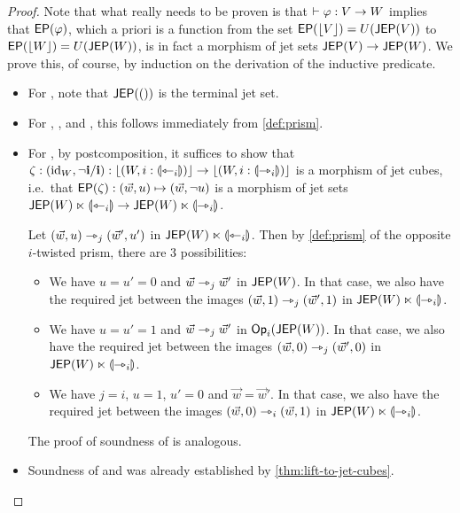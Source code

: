 \documentclass[a4paper]{memoir}
\begin{document}
\begin{proof}
	Note that what really needs to be proven is that $\vdash \varphi : V \to W$ implies that $\mathsf{EP}(\varphi)$, which a priori is a function from the set $\mathsf{EP}(\mathopen{}\left\lfloor V \right\rfloor\mathclose{}) = U(\mathsf{JEP}(V))$ to $\mathsf{EP}(\mathopen{}\left\lfloor W \right\rfloor\mathclose{}) = U(\mathsf{JEP}(W))$, is in fact a morphism of jet sets $\mathsf{JEP}(V) \to \mathsf{JEP}(W)$.
	We prove this, of course, by induction on the derivation of the inductive predicate.
	
	\begin{itemize}
		\item For , note that $\mathsf{JEP}(())$ is the terminal jet set.
	
		\item For , ,  and , this follows immediately from \cref{def:prism}.
		
		\item For , by postcomposition, it suffices to show that $\zeta : (\mathrm{id}_W, \lnot \mathbf{i} / \mathbf{i}) : \mathopen{}\left\lfloor (W, i : {\llparenthesis \leftarrowtriangle_i \rrparenthesis}) \right\rfloor\mathclose{} \to \mathopen{}\left\lfloor (W, i : {\llparenthesis \rightarrowtriangle_i \rrparenthesis}) \right\rfloor\mathclose{}$ is a morphism of jet cubes, i.e.\ that $\mathsf{EP}(\zeta) : (\vec w, u) \mapsto (\vec w, \lnot u)$ is a morphism of jet sets $\mathsf{JEP}(W) \ltimes {\llparenthesis \leftarrowtriangle_i \rrparenthesis} \to \mathsf{JEP}(W) \ltimes {\llparenthesis \rightarrowtriangle_i \rrparenthesis}$.
		
		Let $(\vec w, u) \rightarrowtriangle_j (\vec w', u')$ in $\mathsf{JEP}(W) \ltimes {\llparenthesis \leftarrowtriangle_i \rrparenthesis}$. Then by \cref{def:prism} of the opposite $i$-twisted prism, there are 3 possibilities:
		\begin{itemize}
			\item We have $u = u' = 0$ and $\vec w \rightarrowtriangle_j \vec w'$ in $\mathsf{JEP}(W)$.
			In that case, we also have the required jet between the images $(\vec w, 1) \rightarrowtriangle_j (\vec w', 1)$ in $\mathsf{JEP}(W) \ltimes {\llparenthesis \rightarrowtriangle_i \rrparenthesis}$.
			\item We have $u = u' = 1$ and $\vec w \rightarrowtriangle_j \vec w'$ in ${\mathsf{Op}}_i(\mathsf{JEP}(W))$.
			In that case, we also have the required jet between the images $(\vec w, 0) \rightarrowtriangle_j (\vec w', 0)$ in $\mathsf{JEP}(W) \ltimes {\llparenthesis \rightarrowtriangle_i \rrparenthesis}$.
			\item We have $j = i$, $u = 1$, $u' = 0$ and $\vec w = \vec w'$.
			In that case, we also have the required jet between the images $(\vec w, 0) \rightarrowtriangle_i (\vec w, 1)$ in $\mathsf{JEP}(W) \ltimes {\llparenthesis \rightarrowtriangle_i \rrparenthesis}$.
		\end{itemize}
		The proof of soundness of  is analogous.
		
		\item Soundness of  and  was already established by \cref{thm:lift-to-jet-cubes}.
		

\end{itemize}
\end{proof}
\end{document}
